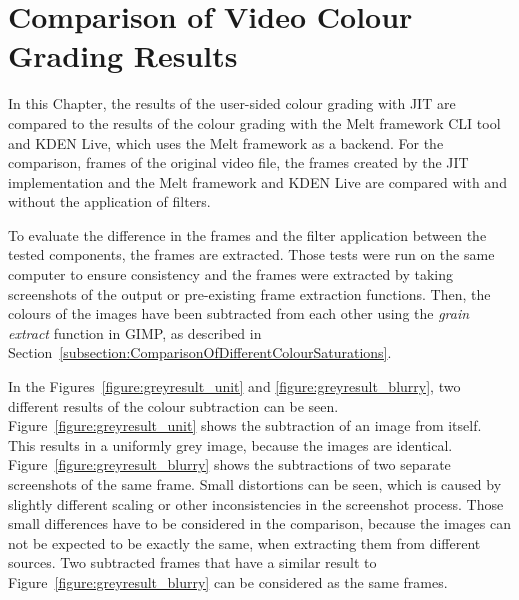 \documentclass[../MasterThesis.tex]{subfiles}
\begin{document}
	
	
%
%
%
%
%
%
%
%
\newpage
\section{Comparison of Video Colour Grading Results} \label{section:experimentalevaluationanddiscussion}  


In this Chapter, the results of the user-sided colour grading with JIT are compared to the results of the colour grading with the Melt framework CLI tool and KDEN Live, which uses the Melt framework as a backend. For the comparison, frames of the original video file, the frames created by the JIT implementation and the Melt framework and KDEN Live are compared with and without the application of filters.


To evaluate the difference in the frames and the filter application between the tested components, the frames are extracted. Those tests were run on the same computer to ensure consistency and the frames were extracted by taking screenshots of the output or pre-existing frame extraction functions.
Then, the colours of the images have been subtracted from each other using the \textit{grain extract} function in GIMP, as described in Section~\ref{subsection:ComparisonOfDifferentColourSaturations}.


In the Figures~\ref{figure:greyresult_unit} and \ref{figure:greyresult_blurry}, two different results of the colour subtraction can be seen. 
%
Figure~\ref{figure:greyresult_unit} shows the subtraction of an image from itself. This results in a uniformly grey image, because the images are identical. Figure~\ref{figure:greyresult_blurry} shows the subtractions of two separate screenshots of the same frame. Small distortions can be seen, which is caused by slightly different scaling or other inconsistencies in the screenshot process. Those small differences have to be considered in the comparison, because the images can not be expected to be exactly the same, when extracting them from different sources. Two subtracted frames that have a similar result to Figure~\ref{figure:greyresult_blurry} can be considered as the same frames.
\end{document}
